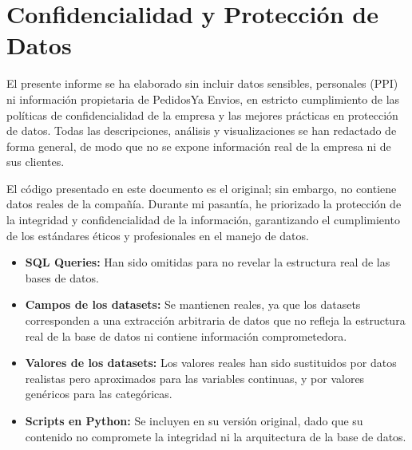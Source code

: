 \section*{Confidencialidad y Protección de Datos}

El presente informe se ha elaborado sin incluir datos sensibles, personales (PPI) ni información propietaria de PedidosYa Envios, en estricto cumplimiento de las políticas de confidencialidad de la empresa y las mejores prácticas en protección de datos. Todas las descripciones, análisis y visualizaciones se han redactado de forma general, de modo que no se expone información real de la empresa ni de sus clientes.

El código presentado en este documento es el original; sin embargo, no contiene datos reales de la compañía. Durante mi pasantía, he priorizado la protección de la integridad y confidencialidad de la información, garantizando el cumplimiento de los estándares éticos y profesionales en el manejo de datos.

\begin{itemize}
	\item \textbf{SQL Queries:} Han sido omitidas para no revelar la estructura real de las bases de datos.
	\item \textbf{Campos de los datasets:} Se mantienen reales, ya que los datasets corresponden a una extracción arbitraria de datos que no refleja la estructura real de la base de datos ni contiene información comprometedora.
	\item \textbf{Valores de los datasets:} Los valores reales han sido sustituidos por datos realistas pero aproximados para las variables continuas, y por valores genéricos para las categóricas.
	\item \textbf{Scripts en Python:} Se incluyen en su versión original, dado que su contenido no compromete la integridad ni la arquitectura de la base de datos.
\end{itemize}
